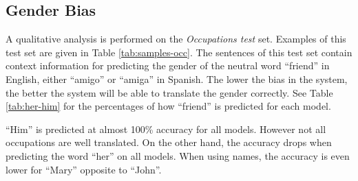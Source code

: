 \documentclass[11pt,a4paper]{article}
\begin{document}
%




\subsection{Gender Bias}

A qualitative analysis is performed on the \textit{Occupations test} set. Examples of this test set are given in Table \ref{tab:samples-occ}. %
The sentences of this test set contain context information for predicting the gender of the neutral word ``friend'' in English, either ``amigo'' or ``amiga'' in Spanish. 
The lower the bias in the system, the better the system will be able to translate the gender correctly. 
See Table \ref{tab:her-him} for the percentages of how ``friend'' is predicted for each model. 


``Him'' is predicted at almost 100\% accuracy for all models. However not all occupations are well translated. 
On the other hand, the accuracy drops when predicting the word ``her'' on all models.
When using names, the accuracy is even lower for ``Mary'' opposite to ``John''. 

\end{document}
